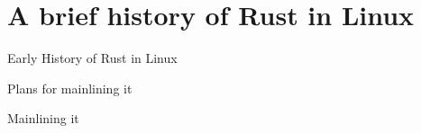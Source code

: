 \section{A brief history of Rust in Linux}

\begin{frame}[c]{Early History of Rust in Linux}
\end{frame}

\begin{frame}[c]{Plans for mainlining it}
\end{frame}

\begin{frame}[c]{Mainlining it}
\end{frame}
